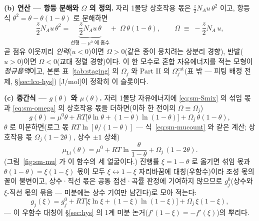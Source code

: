 \documentclass[11pt,a4paper]{article}
\begin{document}
\textbf{(b) 연산 --- 항등 분해와 $\Omega$ 의 정의.} 자리 1몰당 상호작용 몫은 $\tfrac{z}{2}N_Au\,\theta^2$ 이고,
항등식 $\theta^2=\theta-\theta(1-\theta)$ 로 분해하면
\begin{equation}
\frac{z}{2}N_Au\,\theta^2
=\underbrace{\frac{z}{2}N_Au\,\theta}_{\text{선형 --- }\mu^0\text{ 에 흡수}}
+\;\Omega\,\theta(1-\theta),
\qquad
\Omega\;\equiv\;-\frac{z}{2}N_A\,u,
\label{eq:sm-omega}
\end{equation}
곧 점유 이웃끼리 \emph{인력}($u<0$)이면 $\Omega>0$(같은 종이 뭉치려는 상분리 경향), 반발($u>0$)이면
$\Omega<0$(교대 정렬 경향)이다. 이 한 모수로 혼합 자유에너지를 적는 모형이
\emph{정규용액}이고, 본론 표~\ref{tab:staging} 의 $\Omega_j$ 와 Part II 의
$\Omega_j^\mathrm{cat}$(표 밖 — 피팅 배정 전제, \S\ref{sec:lco-hys}) [J/mol]이 정확히 이 슬롯이다.

\textbf{(c) 중간식 --- $g(\theta)$ 와 $\mu(\theta)$.} 자리 1몰당 자유에너지에 \eqref{eq:sm-Smix} 의 섞임 몫과
\eqref{eq:sm-omega} 의 상호작용 몫을 더하면(이하 한 전이의 $\Omega\equiv\Omega_j$)
\begin{equation}
g(\theta)=\mu^0\theta+RT\big[\theta\ln\theta+(1-\theta)\ln(1-\theta)\big]+\Omega_j\,\theta(1-\theta),
\label{eq:sm-gtheta}
\end{equation}
$\theta$ 로 미분하면(로그 몫 $RT\ln[\theta/(1-\theta)]$ --- 식~\eqref{eq:sm-mucount} 와 같은 계산; 상호작용 몫
$\Omega_j(1-2\theta)$, 상수 $\pm1$ 상쇄)
\begin{equation}
\mu_\mathrm{Li}(\theta)=\mu^0+RT\ln\frac{\theta}{1-\theta}+\Omega_j\,(1-2\theta).
\label{eq:mu}
\end{equation}
(그림~\ref{fig:sm-mu} 가 이 함수의 세 얼굴이다.) 진행률 $\xi=1-\theta$ 로 옮기면 섞임 몫과
$\theta(1-\theta)=\xi(1-\xi)$ 몫이 모두 $\xi\leftrightarrow1-\xi$ 자리바꿈에 대칭(우함수)이라 조성 몫의 꼴이
불변이고, 상수·직선 몫은 공통 접선·곡률 판정에 기여하지 않으므로 $g_j^0$(상수와 $\xi$-직선 몫의 묶음 —
미분에는 상수 기여만 남긴다)로 모아 적는다:
\begin{equation}
g_j(\xi)=g_j^0+RT\big[\xi\ln\xi+(1-\xi)\ln(1-\xi)\big]+\Omega_j\,\xi(1-\xi),
\label{eq:gxi}
\end{equation}
--- 이 우함수 대칭이 \S\ref{sec:hys} 의 1계 미분 논거($f'(1-\xi)=-f'(\xi)$)의 뿌리다.
\end{document}

